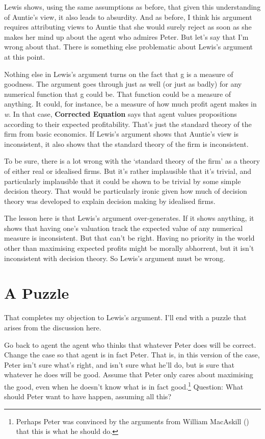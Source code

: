 \documentclass[
  10pt,
  letterpaper,
  DIV=11,
  numbers=noendperiod,
  twoside]{scrartcl}
\begin{document}
Lewis shows, using the same assumptions as before, that given this
understanding of Auntie's view, it also leads to absurdity. And as
before, I think his argument requires attributing views to Auntie that
she would surely reject as soon as she makes her mind up about the agent
who admires Peter. But let's say that I'm wrong about that. There is
something else problematic about Lewis's argument at this point.

Nothing else in Lewis's argument turns on the fact that g is a measure
of goodness. The argument goes through just as well (or just as badly)
for any numerical function that g could be. That function could be a
measure of anything. It could, for instance, be a measure of how much
profit agent makes in \emph{w}. In that case, \textbf{Corrected
Equation} says that agent values propositions according to their
expected profitability. That's just the standard theory of the firm from
basic economics. If Lewis's argument shows that Auntie's view is
inconsistent, it also shows that the standard theory of the firm is
inconsistent.

To be sure, there is a lot wrong with the `standard theory of the firm'
as a theory of either real or idealised firms. But it's rather
implausible that it's trivial, and particularly implausible that it
could be shown to be trivial by some simple decision theory. That would
be particularly ironic given how much of decision theory was developed
to explain decision making by idealised firms.

The lesson here is that Lewis's argument over-generates. If it shows
anything, it shows that having one's valuation track the expected value
of any numerical measure is inconsistent. But that can't be right.
Having no priority in the world other than maximising expected profits
might be morally abhorrent, but it isn't inconsistent with decision
theory. So Lewis's argument must be wrong.

\section{A Puzzle}\label{a-puzzle}

That completes my objection to Lewis's argument. I'll end with a puzzle
that arises from the discussion here.

Go back to agent the agent who thinks that whatever Peter does will be
correct. Change the case so that agent is in fact Peter. That is, in
this version of the case, Peter isn't sure what's right, and isn't sure
what he'll do, but is sure that whatever he does will be good. Assume
that Peter only cares about maximising the good, even when he doesn't
know what is in fact good.\footnote{Perhaps Peter was convinced by the
  arguments from William MacAskill
  () that this is what he should
  do.} Question: What should Peter want to have happen, assuming all
this?
\end{document}
